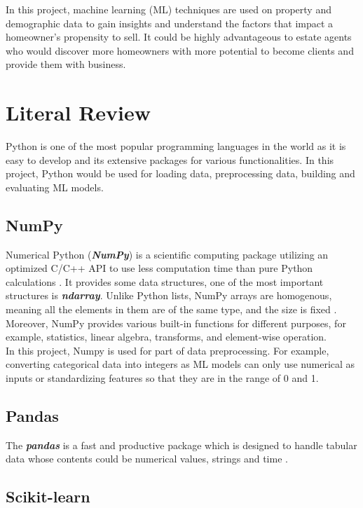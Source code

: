 \documentclass[12pt,twoside]{report}
\begin{document}
In this project, machine learning (ML) techniques are used on property and demographic data to gain insights and understand the factors that impact a homeowner's propensity to sell. It could be highly advantageous to estate agents who would discover more homeowners with more potential to become clients and provide them with business. 

\chapter{Literal Review}
Python is one of the most popular programming languages in the world as it is easy to develop and its extensive packages for various functionalities. In this project, Python would be used for loading data, preprocessing data, building and evaluating ML models. 

\section{NumPy}
Numerical Python (\textit{\textbf{NumPy}}) is a scientific computing package utilizing an optimized C/C++ API to use less computation time than pure Python calculations \citep{RN6}. It provides some data structures, one of the most important structures is \textbf{\emph{ndarray}}. Unlike Python lists, NumPy arrays are homogenous, meaning all the elements in them are of the same type, and the size is fixed \citep{RN4}.  Moreover, NumPy provides various built-in functions for different purposes, for example, statistics, linear algebra,  transforms, and element-wise operation. 
\\

In this project, Numpy is used for part of data preprocessing. For example, converting categorical data into integers as ML models can only use numerical as inputs or standardizing features so that they are in the range of 0 and 1. 

\section{Pandas}
The \textbf{\textit{pandas}} is a fast and productive package which is designed to handle tabular data whose contents could be numerical values, strings and time \citep{RN4}.  

\section{Scikit-learn}
\end{document}
